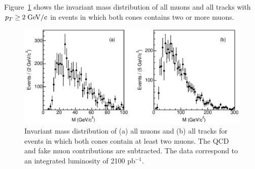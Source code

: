 \documentclass[aps,prd,preprint,floatfix,nofootinbib,superscriptaddress,showpacs,amssymb]{revtex4}
\begin{document}
 Figure~\ref{fig:fig_27} shows the invariant mass distribution of all muons
 and all tracks  with $p_T \geq  2 \; {\rm GeV/}c$ in events in which both cones
 contains two or more muons.
 \begin{figure}
 \begin{center}
 \vspace{-0.3in}
 \leavevmode
 \includegraphics*[width=\textwidth]{fa0_27.eps}
 \caption[]{Invariant mass distribution of (a) all muons and (b) all tracks
            for events in which both cones contain at least two muons.
            The QCD and fake muon contributions are subtracted. The data
            correspond to an integrated luminosity of 2100 pb$^{-1}$.}
 \label{fig:fig_27}
 \end{center}
 \end{figure}
\end{document}
